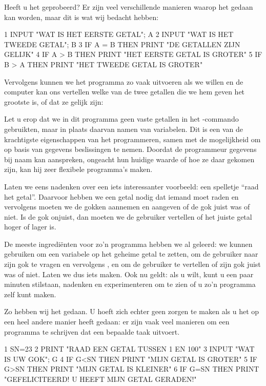 \pagebreak

Heeft u het geprobeerd? Er zijn veel verschillende manieren waarop het gedaan kan worden, maar dit is wat wij bedacht hebben:

\begin{screencode}
1 INPUT "WAT IS HET EERSTE GETAL"; A
2 INPUT "WAT IS HET TWEEDE GETAL"; B
3 IF A = B THEN PRINT "DE GETALLEN ZIJN GELIJK"
4 IF A > B THEN PRINT "HET EERSTE GETAL IS GROTER"
5 IF B > A THEN PRINT "HET TWEEDE GETAL IS GROTER"
\end{screencode}

Vervolgens kunnen we het programma zo vaak uitvoeren als we willen en de computer kan ons vertellen welke van de twee getallen die we hem geven het grootste is, of dat ze gelijk zijn:


Let u erop dat we in dit programma geen vaste getallen in het -commando gebruikten, maar in plaats daarvan namen van variabelen. Dit is een van de krachtigste eigenschappen van het programmeren, samen met de mogelijkheid om op basis van gegevens beslissingen te nemen. Doordat de programmeur gegevens bij naam kan aanspreken, ongeacht hun huidige waarde of hoe ze daar gekomen zijn, kan hij zeer flexibele programma's maken.

Laten we eens nadenken over een iets interessanter voorbeeld: een spelletje ``raad het getal''. Daarvoor hebben we een getal nodig dat iemand moet raden en vervolgens moeten we de gokken aannemen en aangeven of de gok juist was of niet. Is de gok onjuist, dan moeten we de gebruiker vertellen of het juiste getal hoger of lager is.

De meeste ingrediënten voor zo'n programma hebben we al geleerd: we kunnen  gebruiken om een variabele op het geheime getal te zetten,  om de gebruiker naar zijn gok te vragen en vervolgens ,  en  om de gebruiker te vertellen of zijn gok juist was of niet. Laten we dus iets maken. Ook nu geldt: als u wilt, kunt u een paar minuten stilstaan, nadenken en experimenteren om te zien of u zo'n programma zelf kunt maken.

Zo hebben wij het gedaan. U hoeft zich echter geen zorgen te maken als u het op een heel andere manier heeft gedaan: er zijn vaak veel manieren om een programma te schrijven dat een bepaalde taak uitvoert.

\begin{screencode}
1 SN=23
2 PRINT "RAAD EEN GETAL TUSSEN 1 EN 100"
3 INPUT "WAT IS UW GOK"; G
4 IF G<SN THEN PRINT "MIJN GETAL IS GROTER"
5 IF G>SN THEN PRINT "MIJN GETAL IS KLEINER"
6 IF G=SN THEN PRINT "GEFELICITEERD! U HEEFT MIJN GETAL GERADEN!"
\end{screencode}

